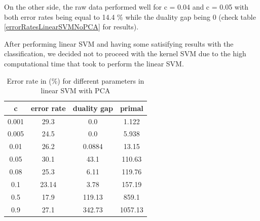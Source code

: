 \documentclass[twoside,a4paper,12pt]{report}
\begin{document}
On the other side, the raw data performed well for c = 0.04 and c = 0.05
with both error rates being equal to 14.4 \% while the duality gap being 0
 (check table \ref{errorRatesLinearSVMNoPCA} for results).

After performing linear SVM and having some satisifying results with the 
classification, we decided not to proceed with the kernel SVM due to the high
computational time that took to perform the linear SVM.

\begin{table}[H]
    \centering
     \begin{tabular}{||c c c c||} 
        \hline \hline
            	 c 	& error rate &	 duality gap &	 primal \\ 
                 \hline
            	0.001	&   29.3 &	 0.0 	& 1.122 \\
                \hline
            	0.005 &   24.5 	& 0.0 &	 5.938 \\
                \hline
            	0.01	&   26.2 	 &0.0884 	& 13.15 \\
                \hline
            	0.05	&   30.1 	& 43.1	& 110.63 \\
                \hline
            	0.08	&   25.3 &	 6.11 &	 119.76 \\
                \hline
            	0.1	    &   23.14 	& 3.78	& 157.19 \\
                \hline
            	0.5	&    \cellcolor{blue!25} 17.9	& \cellcolor{red!25} 119.13	& 859.1 \\
                \hline
             	0.9	&   27.1 	& 342.73 	& 1057.13 \\
        \hline \hline
    \end{tabular}
    \caption{Error rate in (\%) for different parameters in linear SVM with PCA \label{errorRatesLinearSVM}}
\end{table}    
\end{document}
